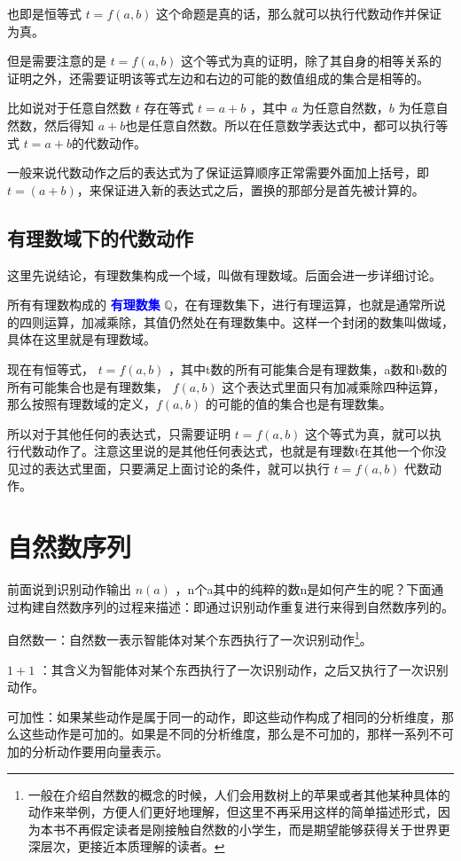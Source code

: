 \documentclass[12pt,oneside]{book}
\renewcommand{\emph}[1]{\textcolor{blue}{\textbf{#1}}}
\begin{document}
也即是恒等式 $t=f(a,b)$ 这个命题是真的话，那么就可以执行代数动作并保证为真。

但是需要注意的是 $t=f(a,b)$ 这个等式为真的证明，除了其自身的相等关系的证明之外，还需要证明该等式左边和右边的可能的数值组成的集合是相等的。

比如说对于任意自然数 $t$ 存在等式 $t=a+b$ ，其中 $a$ 为任意自然数，$b$ 为任意自然数，然后得知 $a+b$也是任意自然数。所以在任意数学表达式中，都可以执行等式 $t=a+b$的代数动作。

一般来说代数动作之后的表达式为了保证运算顺序正常需要外面加上括号，即 $t = (a+b)$，来保证进入新的表达式之后，置换的那部分是首先被计算的。

\subsection{有理数域下的代数动作}
这里先说结论，有理数集构成一个域，叫做有理数域。后面会进一步详细讨论。

所有有理数构成的 \emph{有理数集}  $ \mathbb{Q} $，在有理数集下，进行有理运算，也就是通常所说的四则运算，加减乘除，其值仍然处在有理数集中。这样一个封闭的数集叫做域，具体在这里就是有理数域。

现在有恒等式， $t=f(a, b)$ ，其中t数的所有可能集合是有理数集，a数和b数的所有可能集合也是有理数集， $f(a,b)$ 这个表达式里面只有加减乘除四种运算，那么按照有理数域的定义，$f(a,b)$ 的可能的值的集合也是有理数集。

所以对于其他任何的表达式，只需要证明 $t=f(a,b)$ 这个等式为真，就可以执行代数动作了。注意这里说的是其他任何表达式，也就是有理数t在其他一个你没见过的表达式里面，只要满足上面讨论的条件，就可以执行 $t=f(a,b)$ 代数动作。


\section{自然数序列}
前面说到识别动作输出 $n(a)$ ，n个a其中的纯粹的数n是如何产生的呢？下面通过构建自然数序列的过程来描述：即通过识别动作重复进行来得到自然数序列的。

自然数一：自然数一表示智能体对某个东西执行了一次识别动作\footnote{一般在介绍自然数的概念的时候，人们会用数树上的苹果或者其他某种具体的动作来举例，方便人们更好地理解，但这里不再采用这样的简单描述形式，因为本书不再假定读者是刚接触自然数的小学生，而是期望能够获得关于世界更深层次，更接近本质理解的读者。}。

$1+1$ ：其含义为智能体对某个东西执行了一次识别动作，之后又执行了一次识别动作。

可加性：如果某些动作是属于同一的动作，即这些动作构成了相同的分析维度，那么这些动作是可加的。如果是不同的分析维度，那么是不可加的，那样一系列不可加的分析动作要用向量表示。
\end{document}
